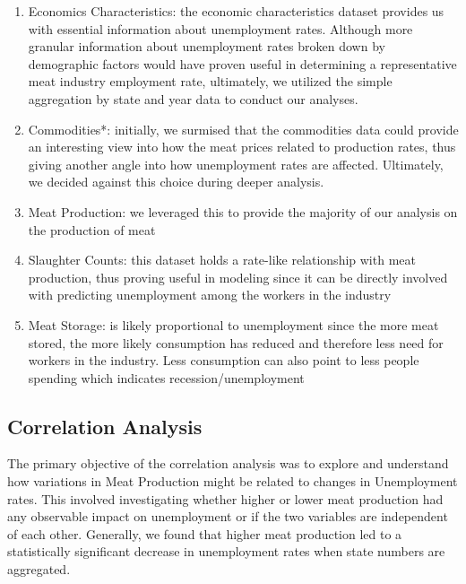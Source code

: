 \documentclass[12pt]{article}
\begin{document}
    \begin{enumerate}
        \item Economics Characteristics: the economic characteristics dataset provides us with essential information about unemployment rates. Although more granular information about unemployment rates broken down by demographic factors would have proven useful in determining a representative meat industry employment rate, ultimately, we utilized the simple aggregation by state and year data to conduct our analyses.

        \item Commodities*: initially, we surmised that the commodities data could provide an interesting view into how the meat prices related to production rates, thus giving another angle into how unemployment rates are affected. Ultimately, we decided against this choice during deeper analysis.

        \item Meat Production: we leveraged this to provide the majority of our analysis on the production of meat

        \item Slaughter Counts: this dataset holds a rate-like relationship with meat production, thus proving useful in modeling since it can be directly involved with predicting unemployment among the workers in the industry

        \item Meat Storage: is likely proportional to unemployment since the more meat stored, the more likely consumption has reduced and therefore less need for workers in the industry. Less consumption can also point to less people spending which indicates recession/unemployment
    \end{enumerate}

    \subsection{Correlation Analysis}

    The primary objective of the correlation analysis was to explore and understand how variations in Meat Production might be related to changes in Unemployment rates. This involved investigating whether higher or lower meat production had any observable impact on unemployment or if the two variables are independent of each other. Generally, we found that higher meat production led to a statistically significant decrease in unemployment rates when state numbers are aggregated.
    
\end{document}
